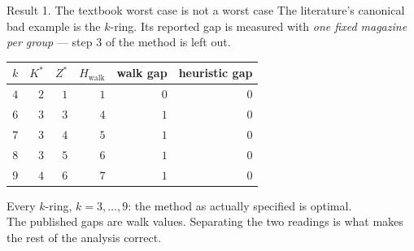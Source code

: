\documentclass[11pt,aspectratio=169]{beamer}
\newcommand{\Zst}{Z^{*}}
\newcommand{\Kst}{K^{*}}
\newcommand{\Hwalk}{H_{\mathrm{walk}}}
\newcommand{\new}[1]{{\color{cAccent}#1}}
\newcommand{\keyline}[1]{\vspace{0.4em}{\color{cRule}\rule{\textwidth}{0.4pt}}\vspace{0.3em}\par#1}
\begin{document}
\begin{frame}{\new{Result 1.} The textbook worst case is not a worst case}
\vspace{0.1em}
{\small The literature's canonical bad example is the $k$-ring. Its reported gap is
measured with \emph{one fixed magazine per group} --- step 3 of the method is left out.}
\vspace{0.7em}
\centering
\begin{tabular}{@{}crrrrr@{}}
\toprule
$k$ & $\Kst$ & $\Zst$ & $\Hwalk$ & walk gap & \new{heuristic gap}\\
\midrule
$4$ & $2$ & $1$ & $1$ & $0$ & \new{$0$}\\
$6$ & $3$ & $3$ & $4$ & $1$ & \new{$0$}\\
$7$ & $3$ & $4$ & $5$ & $1$ & \new{$0$}\\
$8$ & $3$ & $5$ & $6$ & $1$ & \new{$0$}\\
$9$ & $4$ & $6$ & $7$ & $1$ & \new{$0$}\\
\bottomrule
\end{tabular}
\vspace{0.5em}
\keyline{}
\begin{center}
Every $k$-ring, $k=3,\dots,9$: the method as actually specified is \new{optimal}.\\[0.3em]
{\small The published gaps are walk values. Separating the two readings is what makes
the rest of the analysis correct.}
\end{center}
\end{frame}
\end{document}
